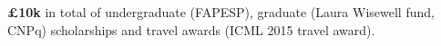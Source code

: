 \begin{bibsection}
%
%
\item[2009 -- 2015] {\bf \pounds 10k} in total of undergraduate (FAPESP), graduate (Laura Wisewell fund, CNPq) scholarships and travel awards (ICML 2015 travel award).
\end{bibsection}